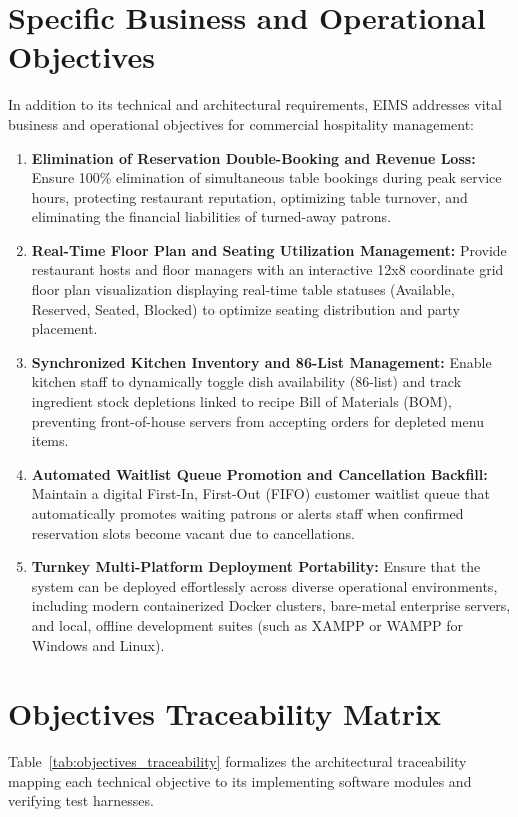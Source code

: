 \section{Specific Business and Operational Objectives}
\label{sec:obj_business}
In addition to its technical and architectural requirements, EIMS addresses vital business and operational objectives for commercial hospitality management:

\begin{enumerate}[label=\textbf{BO\arabic*.}]
    \item \textbf{Elimination of Reservation Double-Booking and Revenue Loss:} Ensure 100\% elimination of simultaneous table bookings during peak service hours, protecting restaurant reputation, optimizing table turnover, and eliminating the financial liabilities of turned-away patrons.
    \item \textbf{Real-Time Floor Plan and Seating Utilization Management:} Provide restaurant hosts and floor managers with an interactive 12x8 coordinate grid floor plan visualization displaying real-time table statuses (Available, Reserved, Seated, Blocked) to optimize seating distribution and party placement.
    \item \textbf{Synchronized Kitchen Inventory and 86-List Management:} Enable kitchen staff to dynamically toggle dish availability (86-list) and track ingredient stock depletions linked to recipe Bill of Materials (BOM), preventing front-of-house servers from accepting orders for depleted menu items.
    \item \textbf{Automated Waitlist Queue Promotion and Cancellation Backfill:} Maintain a digital First-In, First-Out (FIFO) customer waitlist queue that automatically promotes waiting patrons or alerts staff when confirmed reservation slots become vacant due to cancellations.
    \item \textbf{Turnkey Multi-Platform Deployment Portability:} Ensure that the system can be deployed effortlessly across diverse operational environments, including modern containerized Docker clusters, bare-metal enterprise servers, and local, offline development suites (such as XAMPP or WAMPP for Windows and Linux).
\end{enumerate}

\section{Objectives Traceability Matrix}
\label{sec:obj_traceability}
Table~\ref{tab:objectives_traceability} formalizes the architectural traceability mapping each technical objective to its implementing software modules and verifying test harnesses.

